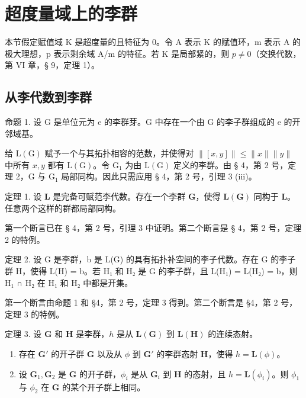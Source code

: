 \section{超度量域上的李群}

本节假定赋值域 K 是超度量的且特征为 0。令 A 表示 K 的赋值环，m 表示 A 的极大理想，p 表示剩余域 A/m 的特征。若 K 是局部紧的，则 \(p \neq 0\)（交换代数，第 VI 章，§ 9，定理 1）。

\subsection{从李代数到李群}

命题 1. 设 G 是单位元为 e 的李群芽。G 中存在一个由 G 的李子群组成的 e 的开邻域基。

给 \(\mathrm{L}(\mathrm{G})\) 赋予一个与其拓扑相容的范数，并使得对 \(\| [x,y]\| \leqslant \| x\| \| y\|\) 中所有 \(x,y\) 都有 \(\mathrm{L}(\mathrm{G})\)。令 \(\mathrm{G}_1\) 为由 \(\mathrm{L}(\mathrm{G})\) 定义的李群。由 § 4，第 2 号，定理 2，G 与 \(\mathrm{G}_1\) 局部同构。因此只需应用 § 4，第 2 号，引理 3 (iii)。

定理 1. 设 \(\mathbf{L}\) 是完备可赋范李代数。存在一个李群 \(\mathbf{G}\)，使得 \(\mathbf{L}(\mathbf{G})\) 同构于 \(\mathbf{L}\)。任意两个这样的群都局部同构。

第一个断言已在 § 4，第 2 号，引理 3 中证明。第二个断言是 § 4，第 2 号，定理 2 的特例。

定理 2. 设 G 是李群，b 是 L(G) 的具有拓扑补空间的李子代数。存在 G 的李子群 H，使得 L(H) = b。若 H₁ 和 H₂ 是 G 的李子群，且 L(H₁) = L(H₂) = b，则 H₁ ∩ H₂ 在 H₁ 和 H₂ 中都是开集。

第一个断言由命题 1 和 §4，第 2 号，定理 3 得到。第二个断言是 §4，第 2 号，定理 3 的特例。

定理 3. 设 \(\mathbf{G}\) 和 \(\mathbf{H}\) 是李群，\(h\) 是从 \(\mathbf{L}(\mathbf{G})\) 到 \(\mathbf{L}(\mathbf{H})\) 的连续态射。

\begin{enumerate}
\def\labelenumi{(\roman{enumi})}
\item
  存在 \(\mathbf{G}'\) 的开子群 \(\mathbf{G}\) 以及从 \(\phi\) 到 \(\mathbf{G}'\) 的李群态射 \(\mathbf{H}\)，使得 \(h = \mathbf{L}(\phi)\)。
\item
  设 \(\mathbf{G}_1, \mathbf{G}_2\) 是 \(\mathbf{G}\) 的开子群，\(\phi_i\) 是从 \(\mathbf{G}_i\) 到 \(\mathbf{H}\) 的态射，且 \(h = \mathbf{L}(\phi_i)\)。则 \(\phi_1\) 与 \(\phi_2\) 在 \(\mathbf{G}\) 的某个开子群上相同。
\end{enumerate}

